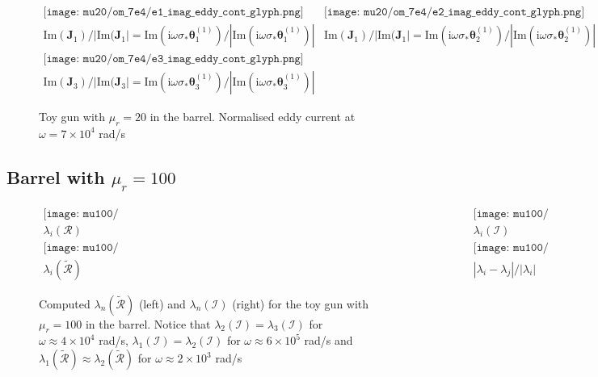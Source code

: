 \documentclass[a4paper,12]{article}
\theoremstyle{definition}
\newcommand{\im}{\mathrm{i}}
\begin{document}
\begin{figure}
\begin{center}
$\begin{array}{cc} 
\texttt{[image: mu20/om\_7e4/e1\_imag\_eddy\_cont\_glyph.png]} & 
\texttt{[image: mu20/om\_7e4/e2\_imag\_eddy\_cont\_glyph.png]} \\
\text{Im}({\bm J}_1 ) / | \text{Im}({\bm J}_1| = \text{Im}( \im\omega \sigma_* {\bm \theta}_1^{(1)} )/ | \text{Im}( \im\omega \sigma_* {\bm \theta}_1^{(1)} )| &
\text{Im}({\bm J}_1 ) / | \text{Im}({\bm J}_1| = \text{Im}( \im\omega \sigma_* {\bm \theta}_2^{(1)} )/ | \text{Im}( \im\omega \sigma_* {\bm \theta}_2^{(1)} )|  \end{array}$\\
 $\begin{array}{c} 
\texttt{[image: mu20/om\_7e4/e3\_imag\_eddy\_cont\_glyph.png]} \\
\text{Im}({\bm J}_3 ) / | \text{Im}({\bm J}_3| = \text{Im}( \im\omega \sigma_* {\bm \theta}_3^{(1)} )/ | \text{Im}( \im\omega \sigma_* {\bm \theta}_3^{(1)} )| 
\end{array}$
\end{center}
\caption{Toy gun with $\mu_r=20$ in the barrel. Normalised eddy current at $\omega = 7 \times 10^4 $ rad/s}
\end{figure}

\clearpage
{}
\subsection{Barrel with $\mu_r=100$}

\begin{figure}[h]
\begin{center}
$\begin{array}{cc}
 \texttt{[image: mu100/OCC\_Gun\_modelv2\_nonsym\_StainSt\_eig\_R\_al\_0.01\_100,1\_sig\_1e6,1e8\_ord\_5.pdf]} & 
\texttt{[image: mu100/OCC\_Gun\_modelv2\_nonsym\_StainSt\_eig\_I\_al\_0.01\_100,1\_sig\_1e6,1e8\_ord\_5.pdf]} \\
\lambda_i({\mathcal R}) & \lambda_i ({\mathcal I}) \\
 \texttt{[image: mu100/OCC\_Gun\_modelv2\_nonsym\_StainSt\_eig\_Rtilde\_al\_0.01\_100,1\_sig\_1e6,1e8\_ord\_5.pdf]} & 
\texttt{[image: mu100/OCC\_Gun\_modelv2\_nonsym\_StainSt\_eig\_prox\_al\_0.01\_100,1\_sig\_1e6,1e8\_ord\_5.pdf]} \\
\lambda_i(\tilde{\mathcal R} ) &  | \lambda_i -\lambda_j|/|\lambda_i|  
\end{array}$
\end{center}
 \caption{Computed $\lambda_n(\tilde{\mathcal R})$ (left) and  $\lambda_n({\mathcal I})$ (right) for the toy gun with $\mu_r=100$ in the barrel. Notice that $\lambda_2({\mathcal I})= \lambda_3({\mathcal I})$ for $\omega \approx 4 \times 10^4$ rad/s,  $\lambda_1({\mathcal I}) = \lambda_2({\mathcal I})$ for  $\omega\approx 6\times 10^5$ rad/s and $\lambda_1(\tilde{\mathcal R})\approx \lambda_2(\tilde{\mathcal R})$ for $\omega\approx 2\times 10^3$ rad/s}
\end{figure}
\end{document}

